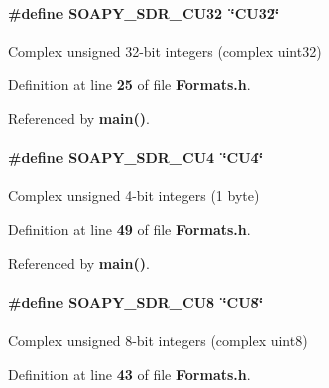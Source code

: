 \paragraph[{S\+O\+A\+P\+Y\+\_\+\+S\+D\+R\+\_\+\+C\+U32}]{\setlength{\rightskip}{0pt plus 5cm}\#define S\+O\+A\+P\+Y\+\_\+\+S\+D\+R\+\_\+\+C\+U32~\char`\"{}C\+U32\char`\"{}}\label{Formats_8h_aae849bd7ef3aa41ad49b12403261d0b7}


Complex unsigned 32-\/bit integers (complex uint32) 



Definition at line {\bf 25} of file {\bf Formats.\+h}.



Referenced by {\bf main()}.

\paragraph[{S\+O\+A\+P\+Y\+\_\+\+S\+D\+R\+\_\+\+C\+U4}]{\setlength{\rightskip}{0pt plus 5cm}\#define S\+O\+A\+P\+Y\+\_\+\+S\+D\+R\+\_\+\+C\+U4~\char`\"{}C\+U4\char`\"{}}\label{Formats_8h_a50c857191d50dc855f9f26eb6a045c75}


Complex unsigned 4-\/bit integers (1 byte) 



Definition at line {\bf 49} of file {\bf Formats.\+h}.



Referenced by {\bf main()}.

\paragraph[{S\+O\+A\+P\+Y\+\_\+\+S\+D\+R\+\_\+\+C\+U8}]{\setlength{\rightskip}{0pt plus 5cm}\#define S\+O\+A\+P\+Y\+\_\+\+S\+D\+R\+\_\+\+C\+U8~\char`\"{}C\+U8\char`\"{}}\label{Formats_8h_a56d1c16838b626fbcb5f01563c789824}


Complex unsigned 8-\/bit integers (complex uint8) 



Definition at line {\bf 43} of file {\bf Formats.\+h}.



